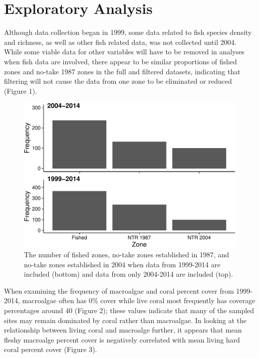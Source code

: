\documentclass[12pt,]{article}
\begin{document}
\newpage

\hypertarget{exploratory-analysis}{%
\section{Exploratory Analysis}\label{exploratory-analysis}}

Although data collection began in 1999, some data related to fish
species density and richness, as well as other fish related data, was
not collected until 2004. While some viable data for other variables
will have to be removed in analyses when fish data are involved, there
appear to be similar proportions of fished zones and no-take 1987 zones
in the full and filtered datasets, indicating that filtering will not
cause the data from one zone to be eliminated or reduced (Figure 1).

\begin{figure}

{\centering \includegraphics{Mullaney_ENV872_Project_files/figure-latex/Zone Exploratory Plot-1} 

}

\caption{The number of fished zones, no-take zones established in 1987, and no-take zones established in 2004 when data from 1999-2014 are included (bottom) and data from only 2004-2014 are included (top).}\label{fig:Zone Exploratory Plot}
\end{figure}

When examining the frequency of macroalgae and coral percent cover from
1999-2014, macroalgae often has 0\% cover while live coral most
frequently has coverage percentages around 40 (Figure 2); these values
indicate that many of the sampled sites may remain dominated by coral
rather than macroalgae. In looking at the relationship between living
coral and macroalge further, it appears that mean fleshy macroalge
percent cover is negatively correlated with mean living hard coral
percent cover (Figure 3).
\end{document}
